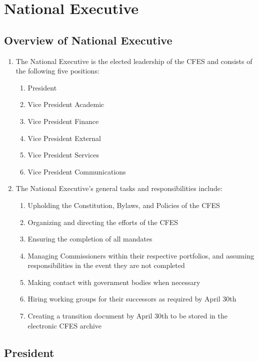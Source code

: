 \section{National Executive}
\label{national-executive}

\subsection{Overview of National Executive}
\label{national-executive-overview-of-national-executive}

\begin{enumerate}
 \item The National Executive is the elected leadership of the CFES and consists of the following five positions:
  \begin{enumerate}
   \item President
   \item Vice President Academic
   \item Vice President Finance
   \item Vice President External
   \item Vice President Services
   \item Vice President Communications
  \end{enumerate}
 \item The National Executive's general tasks and responsibilities include:
  \begin{enumerate}
   \item Upholding the Constitution, Bylaws, and Policies of the CFES
   \item Organizing and directing the efforts of the CFES
   \item Ensuring the completion of all mandates
   \item Managing Commissioners within their respective portfolios, and assuming responsibilities in the event they are not completed
   \item Making contact with government bodies when necessary
   \item Hiring working groups for their successors as required by April 30th
   \item Creating a transition document by April 30th to be stored in the electronic CFES archive
  \end{enumerate}
\end{enumerate}

\subsection{President}
\label{national-executive-president}

